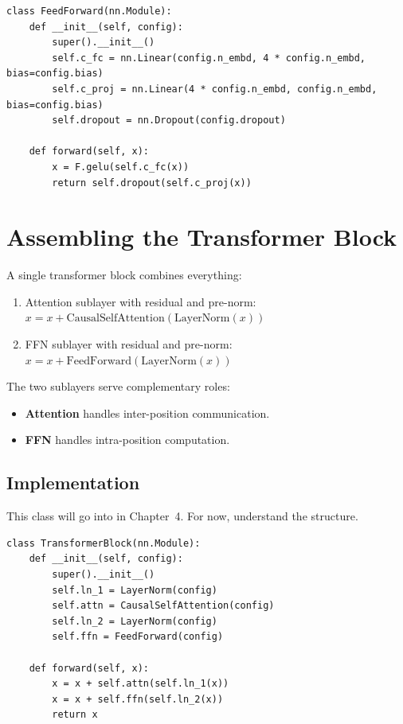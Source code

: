 \concepttag
\begin{lstlisting}
class FeedForward(nn.Module):
    def __init__(self, config):
        super().__init__()
        self.c_fc = nn.Linear(config.n_embd, 4 * config.n_embd, bias=config.bias)
        self.c_proj = nn.Linear(4 * config.n_embd, config.n_embd, bias=config.bias)
        self.dropout = nn.Dropout(config.dropout)

    def forward(self, x):
        x = F.gelu(self.c_fc(x))
        return self.dropout(self.c_proj(x))
\end{lstlisting}

\section{Assembling the Transformer Block}

A single transformer block combines everything:

\begin{enumerate}
  \item Attention sublayer with residual and pre-norm: $x = x + \mathrm{CausalSelfAttention}(\mathrm{LayerNorm}(x))$
  \item FFN sublayer with residual and pre-norm: $x = x + \mathrm{FeedForward}(\mathrm{LayerNorm}(x))$
\end{enumerate}

The two sublayers serve complementary roles:
\begin{itemize}
  \item \textbf{Attention} handles inter-position communication.
  \item \textbf{FFN} handles intra-position computation.
\end{itemize}

\subsection{Implementation}

This class will go into  in Chapter~4. For now, understand the structure.

\concepttag
\begin{lstlisting}
class TransformerBlock(nn.Module):
    def __init__(self, config):
        super().__init__()
        self.ln_1 = LayerNorm(config)
        self.attn = CausalSelfAttention(config)
        self.ln_2 = LayerNorm(config)
        self.ffn = FeedForward(config)

    def forward(self, x):
        x = x + self.attn(self.ln_1(x))
        x = x + self.ffn(self.ln_2(x))
        return x
\end{lstlisting}

